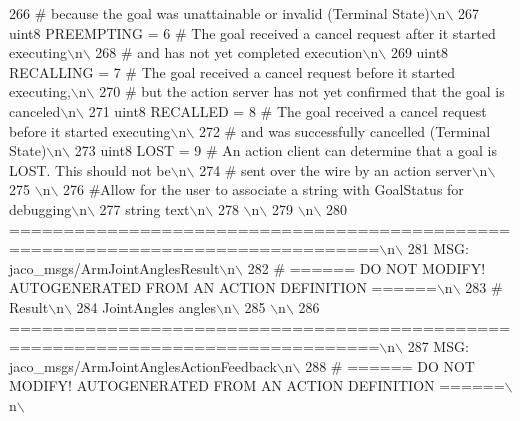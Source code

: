 \begin{DoxyCode}
266 \textcolor{stringliteral}{                            #    because the goal was unattainable or invalid (Terminal State)\(\backslash\)n\(\backslash\)}
267 \textcolor{stringliteral}{uint8 PREEMPTING      = 6   # The goal received a cancel request after it started executing\(\backslash\)n\(\backslash\)}
268 \textcolor{stringliteral}{                            #    and has not yet completed execution\(\backslash\)n\(\backslash\)}
269 \textcolor{stringliteral}{uint8 RECALLING       = 7   # The goal received a cancel request before it started executing,\(\backslash\)n\(\backslash\)}
270 \textcolor{stringliteral}{                            #    but the action server has not yet confirmed that the goal is canceled\(\backslash\)n\(\backslash\)}
271 \textcolor{stringliteral}{uint8 RECALLED        = 8   # The goal received a cancel request before it started executing\(\backslash\)n\(\backslash\)}
272 \textcolor{stringliteral}{                            #    and was successfully cancelled (Terminal State)\(\backslash\)n\(\backslash\)}
273 \textcolor{stringliteral}{uint8 LOST            = 9   # An action client can determine that a goal is LOST. This should not be\(\backslash\)n\(\backslash\)}
274 \textcolor{stringliteral}{                            #    sent over the wire by an action server\(\backslash\)n\(\backslash\)}
275 \textcolor{stringliteral}{\(\backslash\)n\(\backslash\)}
276 \textcolor{stringliteral}{#Allow for the user to associate a string with GoalStatus for debugging\(\backslash\)n\(\backslash\)}
277 \textcolor{stringliteral}{string text\(\backslash\)n\(\backslash\)}
278 \textcolor{stringliteral}{\(\backslash\)n\(\backslash\)}
279 \textcolor{stringliteral}{\(\backslash\)n\(\backslash\)}
280 \textcolor{stringliteral}{================================================================================\(\backslash\)n\(\backslash\)}
281 \textcolor{stringliteral}{MSG: jaco\_msgs/ArmJointAnglesResult\(\backslash\)n\(\backslash\)}
282 \textcolor{stringliteral}{# ====== DO NOT MODIFY! AUTOGENERATED FROM AN ACTION DEFINITION ======\(\backslash\)n\(\backslash\)}
283 \textcolor{stringliteral}{# Result\(\backslash\)n\(\backslash\)}
284 \textcolor{stringliteral}{JointAngles angles\(\backslash\)n\(\backslash\)}
285 \textcolor{stringliteral}{\(\backslash\)n\(\backslash\)}
286 \textcolor{stringliteral}{================================================================================\(\backslash\)n\(\backslash\)}
287 \textcolor{stringliteral}{MSG: jaco\_msgs/ArmJointAnglesActionFeedback\(\backslash\)n\(\backslash\)}
288 \textcolor{stringliteral}{# ====== DO NOT MODIFY! AUTOGENERATED FROM AN ACTION DEFINITION ======\(\backslash\)n\(\backslash\)}

\end{DoxyCode}

